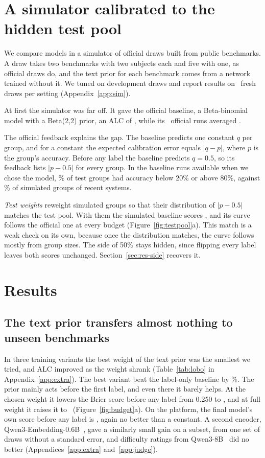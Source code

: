 \documentclass{article}
\begin{document}
\section{A simulator calibrated to the hidden test pool}
\label{sec:testpool}
We compare models in a simulator of official draws built from public benchmarks.
A draw takes two benchmarks with two subjects each and five with one, as official draws do, and the text prior for each benchmark comes from a network trained without it.
We tuned on development draws and report results on \ConfDraws\ fresh draws per setting (Appendix~\ref{app:sim}).

At first the simulator was far off.
It gave the official baseline, a Beta-binomial model with a Beta(2,2) prior, an ALC of \RSimBtwoACU, while its \OffBetaAllN\ official runs averaged \ROffBetaAllMean.

The official feedback explains the gap.
The baseline predicts one constant $q$ per group, and for a constant the expected calibration error equals $|q-p|$, where $p$ is the group's accuracy.
Before any label the baseline predicts $q=0.5$, so its feedback lists $|p-0.5|$ for every group.
In the baseline runs available when we chose the model, \TpFarShare\% of test groups had accuracy below 20\% or above 80\%, against \ShortTrainFar\% of simulated groups of recent systems.

\emph{Test weights} reweight simulated groups so that their distribution of $|p-0.5|$ matches the test pool.
With them the simulated baseline scores \RSimBtwoACO, and its curve follows the official one at every budget (Figure~\ref{fig:testpool}a).
This match is a weak check on its own, because once the distribution matches, the curve follows mostly from group sizes.
The side of 50\% stays hidden, since flipping every label leaves both scores unchanged.
Section~\ref{sec:res-side} recovers it.

\section{Results}
\label{sec:results}

\subsection{The text prior transfers almost nothing to unseen benchmarks}
\label{sec:res-prior}
In three training variants the best weight of the text prior was the smallest we tried, and ALC improved as the weight shrank (Table~\ref{tab:lobo} in Appendix~\ref{app:extra}).
The best variant beat the label-only baseline by \ShortLoboRel\%.
The prior mainly acts before the first label, and even there it barely helps.
At the chosen weight it lowers the Brier score before any label from 0.250 to \RConfFullBzero, and at full weight it raises it to \RConfGammaOneBzero\ (Figure~\ref{fig:budget}a).
On the platform, the final model's own score before any label is \RSideBzeroLthree, again no better than a constant.
A second encoder, Qwen3-Embedding-0.6B~\citep{qwen3emb}, gave a similarly small gain on a subset, from one set of draws without a standard error, and difficulty ratings from Qwen3-8B~\citep{qwen3} did no better (Appendices~\ref{app:extra} and~\ref{app:judge}).
\end{document}
